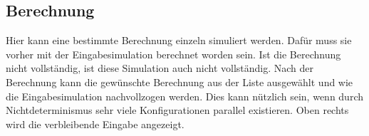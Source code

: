 \subsection{Berechnung}
Hier kann eine bestimmte Berechnung einzeln simuliert werden. Dafür muss sie vorher mit der Eingabesimulation berechnet worden sein. Ist die Berechnung nicht vollständig, ist diese Simulation auch nicht vollständig. Nach der Berechnung kann die gewünschte Berechnung aus der Liste ausgewählt und wie die Eingabesimulation nachvollzogen werden. Dies kann nützlich sein, wenn durch Nichtdeterminismus sehr viele Konfigurationen parallel existieren. Oben rechts wird die verbleibende Eingabe angezeigt.
